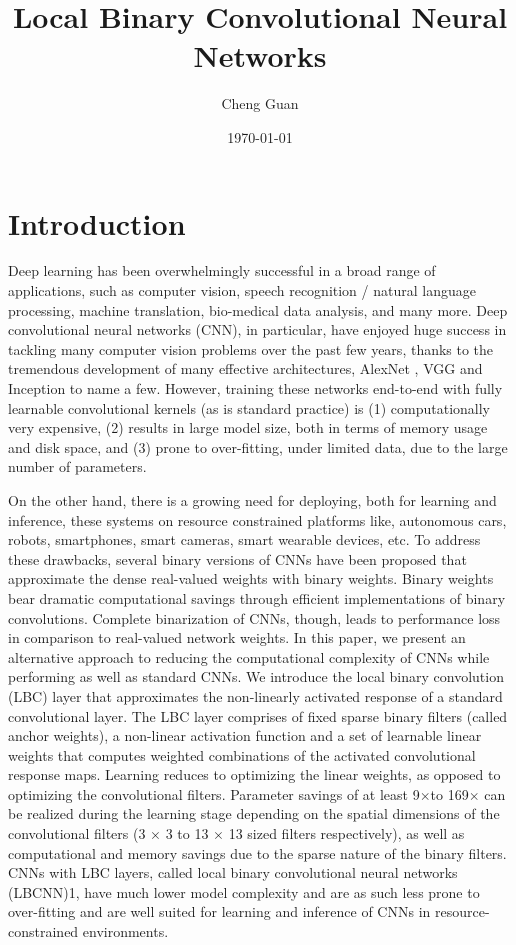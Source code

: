 \documentclass[10pt,twocolumn,a4paper]{article}
\title{Local Binary Convolutional Neural Networks}
\author{Cheng Guan}
\date{\today}
\begin{document}
\maketitle
\section{Introduction}

Deep learning has been overwhelmingly successful in a broad range of applications, such as computer vision, speech recognition / natural language processing, machine translation, bio-medical data analysis, and many more. Deep convolutional neural networks (CNN), in particular, have enjoyed huge success in tackling many computer vision problems over the past few years, thanks to the tremendous development of many effective architectures, AlexNet \cite{krizhevsky2012imagenet}, VGG \cite{simonyan2014very} and Inception \cite{szegedy2015going}  to name a few. However, training these networks end-to-end with fully learnable convolutional kernels (as is standard practice) is (1) computationally very expensive, (2) results in large model size, both in terms of memory usage and disk space, and (3) prone to over-fitting, under limited data, due to the large number of parameters.

On the other hand, there is a growing need for deploying, both for learning and inference, these systems on resource constrained platforms like, autonomous cars, robots, smartphones, smart cameras, smart wearable devices, etc. To address these drawbacks, several binary versions of CNNs have been proposed \cite{courbariaux2015binaryconnect,rastegari2016xnor} that approximate the dense real-valued weights with binary weights. Binary weights bear dramatic computational savings through efficient implementations of binary convolutions. Complete binarization of CNNs, though, leads to performance loss in comparison to real-valued network weights. In this paper, we present an alternative approach to reducing the computational complexity of CNNs while performing as well as standard CNNs. We introduce the local binary convolution (LBC) layer that approximates the non-linearly activated response of a standard convolutional layer. The LBC layer comprises of fixed sparse binary filters (called anchor weights), a non-linear activation function and a set of learnable linear weights that computes weighted combinations of the activated convolutional response maps. Learning reduces to optimizing the linear weights, as opposed to optimizing the convolutional filters. Parameter savings of at least 9$\times$to 169$\times$ can be realized during the learning stage depending on the spatial dimensions of the convolutional filters (3 $\times$ 3 to 13 $\times$  13 sized filters respectively), as well as computational and memory savings due to the sparse nature of the binary filters. CNNs with LBC layers, called local binary convolutional neural networks (LBCNN)1, have much lower model complexity and are as such less prone to over-fitting and are well suited for learning and inference of CNNs in resource-constrained environments.
\end{document}
